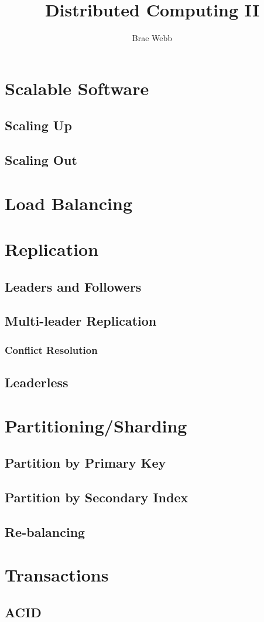 \title{Distributed Computing II}
\author{Brae Webb}
\date{}

\maketitle

\section{Scalable Software}

\subsection{Scaling Up}

\subsection{Scaling Out}

\section{Load Balancing}

\section{Replication}
\subsection{Leaders and Followers}

\subsection{Multi-leader Replication}
\subsubsection{Conflict Resolution}

\subsection{Leaderless}

\section{Partitioning/Sharding}

\subsection{Partition by Primary Key}

\subsection{Partition by Secondary Index}

\subsection{Re-balancing}

\section{Transactions}

\subsection{ACID}
